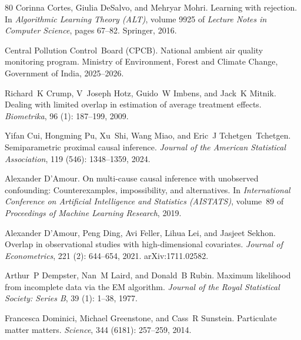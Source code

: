 \begin{thebibliography}{80}
Corinna Cortes, Giulia DeSalvo, and Mehryar Mohri.
\newblock Learning with rejection.
\newblock In \emph{Algorithmic Learning Theory (ALT)}, volume 9925 of \emph{Lecture Notes in Computer Science}, pages 67--82. Springer, 2016.

Central Pollution Control~Board (CPCB).
\newblock National ambient air quality monitoring program.
\newblock Ministry of Environment, Forest and Climate Change, Government of India, 2025--2026.

Richard~K Crump, V~Joseph Hotz, Guido~W Imbens, and Jack~K Mitnik.
\newblock Dealing with limited overlap in estimation of average treatment effects.
\newblock \emph{Biometrika}, 96 (1): 187--199, 2009.

Yifan Cui, Hongming Pu, Xu~Shi, Wang Miao, and Eric~J Tchetgen~Tchetgen.
\newblock Semiparametric proximal causal inference.
\newblock \emph{Journal of the American Statistical Association}, 119 (546): 1348--1359, 2024.

Alexander D'Amour.
\newblock On multi-cause causal inference with unobserved confounding: Counterexamples, impossibility, and alternatives.
\newblock In \emph{International Conference on Artificial Intelligence and Statistics (AISTATS)}, volume~89 of \emph{Proceedings of Machine Learning Research}, 2019.

Alexander D'Amour, Peng Ding, Avi Feller, Lihua Lei, and Jasjeet Sekhon.
\newblock Overlap in observational studies with high-dimensional covariates.
\newblock \emph{Journal of Econometrics}, 221 (2): 644--654, 2021.
\newblock arXiv:1711.02582.

Arthur~P Dempster, Nan~M Laird, and Donald~B Rubin.
\newblock Maximum likelihood from incomplete data via the {EM} algorithm.
\newblock \emph{Journal of the Royal Statistical Society: Series B}, 39 (1): 1--38, 1977.

Francesca Dominici, Michael Greenstone, and Cass~R Sunstein.
\newblock Particulate matter matters.
\newblock \emph{Science}, 344 (6181): 257--259, 2014.


\end{thebibliography}
